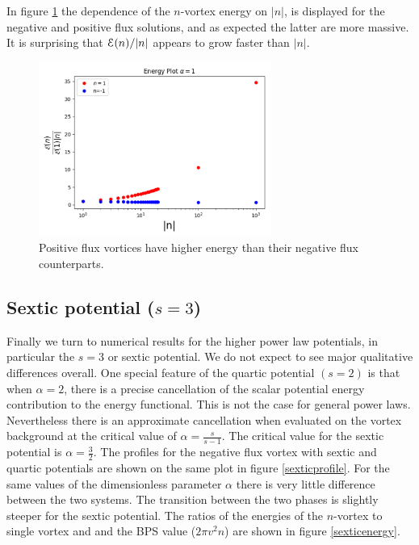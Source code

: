 In figure \ref{positiveenergy} the dependence of the $n$-vortex energy on $|n|$, is displayed for the negative and positive flux solutions, and as expected the latter are more massive.  It is surprising  that ${\cal E }(n)/|n|$ appears to grow faster than $|n|$.
\begin{figure}[H]
\begin{center}
 \includegraphics[width=3in]{Chapter_2_Folder_1912.11321/figures/positive_n_energy.pdf}
     \caption[Energy per flux for positive winding number $n$.]{{\small Positive flux vortices have higher energy than their negative flux counterparts.}} \label{positiveenergy}
    \end{center}
\end{figure}
\subsection{Sextic potential ($s=3$)}
Finally we turn to numerical results for the higher power law potentials, in particular the $s=3$
or sextic potential. We do not expect to see major qualitative differences overall. One special feature of the quartic potential $(s=2)$ is that when $\alpha=2$, there is a precise cancellation of the scalar potential energy contribution to the energy functional. This is not the case for general power laws. Nevertheless there is an approximate cancellation when evaluated on the vortex background at the critical value of $\alpha = \frac{s}{s-1}$.   The critical value for the sextic potential is $\alpha = \frac32$.
The profiles for the negative flux vortex with sextic and quartic potentials are shown on the same plot in figure \ref{sexticprofile}. For the same values of the dimensionless parameter $\alpha$ there is very little difference between the two systems. The transition between the two phases is slightly steeper for the sextic potential. The ratios of the energies of the $n$-vortex to single vortex and and the BPS value ($2\pi v^2 n$) are shown in figure 
\ref{sexticenergy}.

